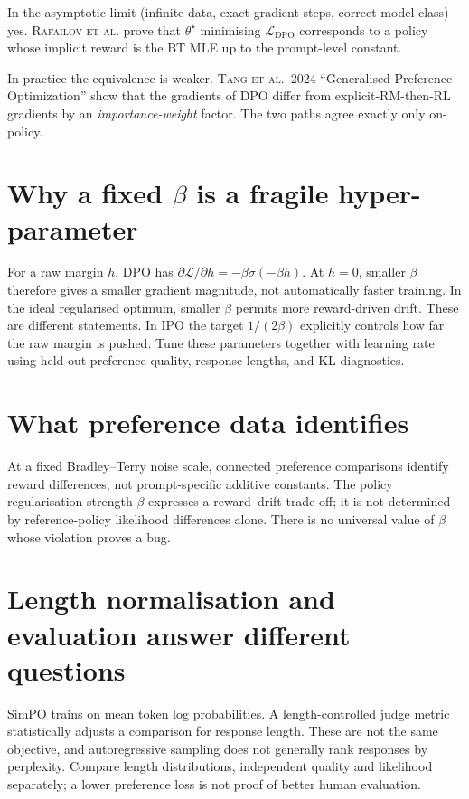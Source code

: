 \documentclass[11pt,oneside]{scrbook}
\begin{document}
In the asymptotic limit (infinite data, exact gradient steps,
correct model class) -- yes. \textsc{Rafailov et al.} prove that
$\theta^\star$ minimising $\mathcal{L}_{\text{DPO}}$ corresponds to a
policy whose implicit reward is the BT MLE up to the prompt-level
constant.

In practice the equivalence is weaker. \textsc{Tang et al.\ 2024}
``Generalised Preference Optimization'' show that the gradients of
DPO differ from explicit-RM-then-RL gradients by an
\emph{importance-weight} factor. The two paths agree exactly only
on-policy.

\section{Why a fixed $\beta$ is a fragile hyper-parameter}

For a raw margin $h$, DPO has
$\partial\mathcal L/\partial h=-\beta\sigma(-\beta h)$.
At $h=0$, smaller $\beta$ therefore gives a smaller gradient magnitude,
not automatically faster training. In the ideal regularised optimum,
smaller $\beta$ permits more reward-driven drift. These are different
statements. In IPO the target $1/(2\beta)$ explicitly controls how far the
raw margin is pushed. Tune these parameters together with learning rate
using held-out preference quality, response lengths, and KL diagnostics.

\section{What preference data identifies}
At a fixed Bradley--Terry noise scale, connected preference comparisons
identify reward differences, not prompt-specific additive constants.
The policy regularisation strength $\beta$ expresses a reward--drift
trade-off; it is not determined by reference-policy likelihood differences
alone. There is no universal value of $\beta$ whose violation proves a bug.

\section{Length normalisation and evaluation answer different questions}
SimPO trains on mean token log probabilities. A length-controlled judge metric
statistically adjusts a comparison for response length. These are not the same
objective, and autoregressive sampling does not generally rank responses by
perplexity. Compare length distributions, independent quality and likelihood
separately; a lower preference loss is not proof of better human evaluation.
\end{document}

